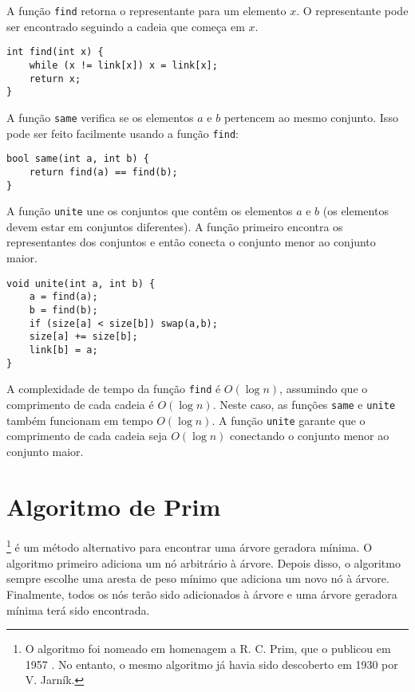A função \texttt{find} retorna 
o representante para um elemento $x$. 
O representante pode ser encontrado seguindo 
a cadeia que começa em $x$.

\begin{lstlisting}
int find(int x) {
    while (x != link[x]) x = link[x];
    return x;
}
\end{lstlisting}

A função \texttt{same} verifica 
se os elementos $a$ e $b$ pertencem ao mesmo conjunto. 
Isso pode ser feito facilmente usando a 
função \texttt{find}:

\begin{lstlisting}
bool same(int a, int b) {
    return find(a) == find(b);
}
\end{lstlisting}

\begin{samepage}
A função \texttt{unite} une os conjuntos 
que contêm os elementos $a$ e $b$ 
(os elementos devem estar em conjuntos diferentes). 
A função primeiro encontra os representantes 
dos conjuntos e então conecta o conjunto menor 
ao conjunto maior.

\begin{lstlisting}
void unite(int a, int b) {
    a = find(a);
    b = find(b);
    if (size[a] < size[b]) swap(a,b);
    size[a] += size[b];
    link[b] = a;
}
\end{lstlisting}
\end{samepage}

A complexidade de tempo da função \texttt{find} 
é $O(\log n)$, assumindo que o comprimento de cada 
cadeia é $O(\log n)$. 
Neste caso, as funções \texttt{same} e \texttt{unite} 
também funcionam em tempo $O(\log n)$. 
A função \texttt{unite} garante que o 
comprimento de cada cadeia seja $O(\log n)$ conectando 
o conjunto menor ao conjunto maior.

\section{Algoritmo de Prim}


\footnote{O algoritmo foi 
nomeado em homenagem a R. C. Prim, que o publicou em 1957 \cite{pri57}.
No entanto, o mesmo algoritmo já havia sido descoberto em 1930
por V. Jarník.} é um método alternativo
para encontrar uma árvore geradora mínima.
O algoritmo primeiro adiciona um nó arbitrário
à árvore.
Depois disso, o algoritmo sempre escolhe
uma aresta de peso mínimo que
adiciona um novo nó à árvore.
Finalmente, todos os nós terão sido adicionados à árvore
e uma árvore geradora mínima terá sido encontrada.

